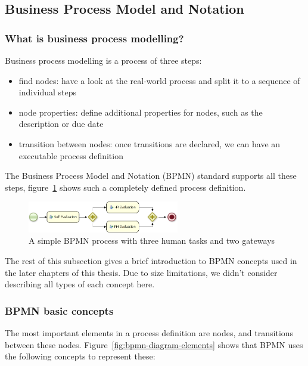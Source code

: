 \subsection{Business Process Model and Notation}

\subsubsection*{What is business process modelling?}

Business process modelling is a process of three steps:

\begin{itemize}
\item find nodes: have a look at the real-world process and split it to a sequence of individual steps
\item node properties: define additional properties for nodes, such as the description or due date
\item transition between nodes: once transitions are declared, we can have an executable process definition
\end{itemize}

The Business Process Model and Notation (BPMN) standard\cite{bpmn} supports all
these steps, figure~\ref{fig:bpmn-sample} shows such a completely defined
process definition.

\begin{figure}[H]
\centering
\includegraphics[width=250px,keepaspectratio]{bpmn-sample.png}
\caption{A simple BPMN process with three human tasks and two gateways}
\label{fig:bpmn-sample}
\end{figure}

The rest of this subsection gives a brief introduction to BPMN concepts used in
the later chapters of this thesis. Due to size limitations, we didn't consider
describing all types of each concept here.

\subsubsection*{BPMN basic concepts}

The most important elements in a process definition are nodes, and transitions
between these nodes. Figure~\ref{fig:bpmn-diagram-elements} shows that BPMN
uses the following concepts to represent these:

